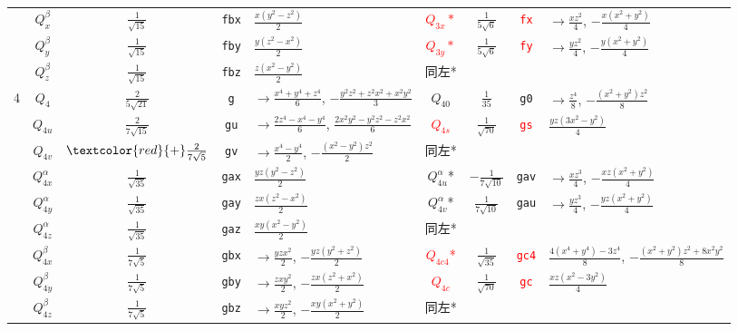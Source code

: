 \documentclass[11pt]{easymemo}
\begin{document}
\begin{table}[ht!]
\begin{center}
\begin{tabular}{c||c|c|c|l||c|c|c|l}
  & $Q_x^\beta$ & $\frac{1}{\sqrt{15}}$ & \texttt{fbx} & $ \frac{x(y^2-z^2)}{2}$ &
\textcolor{red}{$Q_{3x}*$} & $\frac{1}{5\sqrt{6}}$ & \textcolor{red}{\texttt{fx}} & $\to\frac{xz^2}{4}$, $-\frac{x(x^2+y^2)}{4}$ \\
  & $Q_y^\beta$ & $\frac{1}{\sqrt{15}}$ & \texttt{fby} & $ \frac{y(z^2-x^2)}{2}$ &
\textcolor{red}{$Q_{3y}*$} & $\frac{1}{5\sqrt{6}}$ & \textcolor{red}{\texttt{fy}} & $\to\frac{yz^2}{4}$, $-\frac{y(x^2+y^2)}{4}$ \\
  & $Q_z^\beta$ & $\frac{1}{\sqrt{15}}$ & \texttt{fbz} & $ \frac{z(x^2-y^2)}{2}$ & 同左* & & & \\
 \hline
4 & $Q_4$ & $\frac{2}{5\sqrt{21}}$ & \texttt{g} & $\to\frac{x^{4}+y^4+z^4}{6}$, $-\frac{y^2z^2+z^2x^2+x^2y^2}{3}$ &
$Q_{40}$ & $\frac{1}{35}$ & \texttt{g0} & $\to\frac{z^4}{8}$, $-\frac{(x^2+y^2)z^2}{8}$ \\
  & $Q_{4u}$ & $\frac{2}{7\sqrt{15}}$ & \texttt{gu} & $\to\frac{2z^4-x^4-y^4}{6}$, $\frac{2x^2y^2-y^2z^2-z^2x^2}{6}$ &
\textcolor{red}{$Q_{4s}$} & $\frac{1}{\sqrt{70}}$ & \textcolor{red}{\texttt{gs}} & $\frac{yz(3x^{2}-y^{2})}{4}$ \\
  & $Q_{4v}$ & $\textcolor{red}{+}\frac{2}{7\sqrt{5}}$ & \texttt{gv} & $\to\frac{x^4-y^4}{2}$, $-\frac{(x^2-y^2)z^2}{2}$ &
同左* & & & \\
  & $Q_{4x}^\alpha$ & $\frac{1}{\sqrt{35}}$ & \texttt{gax} & $ \frac{yz(y^2-z^2)}{2} $ &
$Q_{4u}^\alpha$* & $-\frac{1}{7\sqrt{10}}$ & \texttt{gav} & $\to\frac{xz^3}{4}$, $-\frac{xz(x^2+y^2)}{4}$ \\
  &$ Q_{4y}^\alpha$ & $\frac{1}{\sqrt{35}}$ & \texttt{gay} & $\frac{zx(z^2-x^2)}{2} $ &
$Q_{4v}^\alpha$* & $\frac{1}{7\sqrt{10}}$ & \texttt{gau} & $\to\frac{yz^3}{4}$, $-\frac{yz(x^2+y^2)}{4}$ \\
  & $Q_{4z}^\alpha$ & $\frac{1}{\sqrt{35}}$ & \texttt{gaz} & $\frac{xy(x^2-y^2)}{2} $ &
同左* & & & \\
  & $Q_{4x}^\beta$ & $\frac{1}{7\sqrt{5}}$ & \texttt{gbx} & $\to\frac{yzx^2}{2}$, $-\frac{yz(y^2+z^2)}{2}$ &
\textcolor{red}{$Q_{4c4}$*} & $\frac{1}{\sqrt{35}}$ & \textcolor{red}{\texttt{gc4}} & $\frac{4(x^4+y^4)-3z^4}{8}$, $-\frac{(x^2+y^2)z^2+8x^2y^2}{8}$ \\
  & $Q_{4y}^\beta$ & $\frac{1}{7\sqrt{5}}$ & \texttt{gby} & $\to\frac{zxy^2}{2}$, $-\frac{zx(z^2+x^2)}{2}$ &
\textcolor{red}{$Q_{4c}$} & $\frac{1}{\sqrt{70}}$ & \textcolor{red}{\texttt{gc}} & $\frac{xz(x^{2}-3y^{2})}{4}$ \\
  & $Q_{4z}^\beta$ & $\frac{1}{7\sqrt{5}}$ & \texttt{gbz} & $\to\frac{xyz^2}{2}$, $-\frac{xy(x^2+y^2)}{2}$ &
同左* & & & \\
 \hline \hline
\end{tabular}
\end{center}
\end{table}
\end{document}
